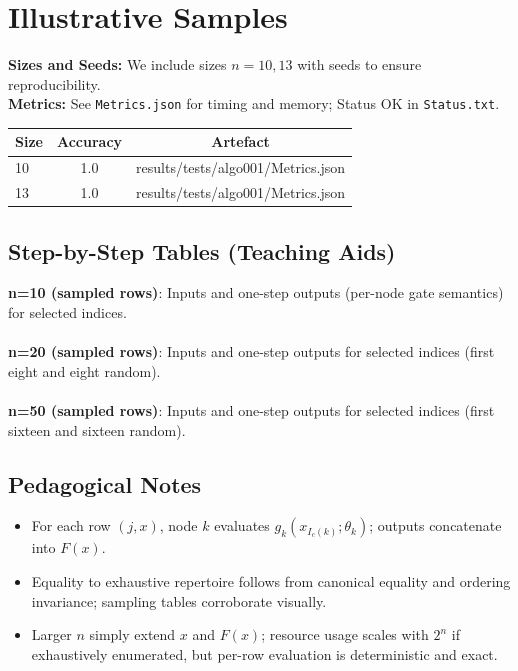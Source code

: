 \documentclass[11pt]{article}
\begin{document}
\section{Illustrative Samples}
\textbf{Sizes and Seeds:} We include sizes \(n=10,13\) with seeds to ensure reproducibility.\\
\textbf{Metrics:} See \texttt{Metrics.json} for timing and memory; Status OK in \texttt{Status.txt}.\\
\begin{center}
\begin{tabular}{lcc}
\toprule
\textbf{Size} & \textbf{Accuracy} & \textbf{Artefact} \\
\midrule
10 & 1.0 & results/tests/algo001/Metrics.json \\
13 & 1.0 & results/tests/algo001/Metrics.json \\
\bottomrule
\end{tabular}
\end{center}

\subsection*{Step-by-Step Tables (Teaching Aids)}
\textbf{n=10 (sampled rows)}: Inputs and one-step outputs (per-node gate semantics) for selected indices.\\
\\
\textbf{n=20 (sampled rows)}: Inputs and one-step outputs for selected indices (first eight and eight random).\\
\\
\textbf{n=50 (sampled rows)}: Inputs and one-step outputs for selected indices (first sixteen and sixteen random).\\

\subsection*{Pedagogical Notes}
\begin{itemize}
 \item For each row $(j,x)$, node $k$ evaluates $g_k(x_{I_c(k)};\theta_k)$; outputs concatenate into $F(x)$.
 \item Equality to exhaustive repertoire follows from canonical equality and ordering invariance; sampling tables corroborate visually.
 \item Larger $n$ simply extend $x$ and $F(x)$; resource usage scales with $2^n$ if exhaustively enumerated, but per-row evaluation is deterministic and exact.
\end{itemize}
\end{document}
